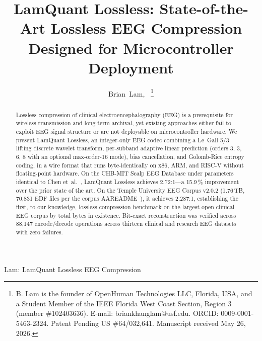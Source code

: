 \documentclass[journal]{IEEEtran}
\begin{document}
\title{LamQuant Lossless: State-of-the-Art Lossless EEG Compression
Designed for Microcontroller Deployment}

\author{Brian~Lam,~%
\thanks{B. Lam is the founder of OpenHuman Technologies LLC,
Florida, USA, and a Student Member of the IEEE Florida West
Coast Section, Region 3 (member \#102403636). E-mail:
briankhanglam@usf.edu. ORCID: 0009-0001-5463-2324.
Patent Pending US \#64/032,641.
Manuscript received May 26, 2026.}}

%
{Lam: LamQuant Lossless EEG Compression}

\maketitle

\begin{abstract}
Lossless compression of clinical electroencephalography (EEG) is a
prerequisite for wireless transmission and long-term archival, yet
existing approaches either fail to exploit EEG signal structure or
are not deployable on microcontroller hardware. We present LamQuant
Lossless, an integer-only EEG codec combining a Le~Gall 5/3 lifting
discrete wavelet transform, per-subband adaptive linear prediction
(orders 3, 3, 6, 8 with an optional max-order-16 mode), bias
cancellation, and Golomb-Rice entropy coding, in a wire format
that runs byte-identically on x86, ARM, and RISC-V without
floating-point hardware. On the CHB-MIT Scalp EEG Database under
parameters identical to Chen et~al.~\cite{chen2018vlsi}, LamQuant
Lossless achieves 2.72:1---a 15.9\,\% improvement over the prior
state of the art. On the Temple University EEG Corpus v2.0.2
(1.76\,TB, 70{,}831 EDF files per the corpus
AAREADME~\cite{tueg_aareadme_v202}), it achieves 2.287:1,
establishing the first, to our knowledge, lossless compression
benchmark on the largest open clinical EEG corpus by total bytes
in existence. Bit-exact reconstruction was verified across
88{,}147 encode/decode operations across thirteen clinical and
research EEG datasets with zero failures.
\end{abstract}
\end{document}

